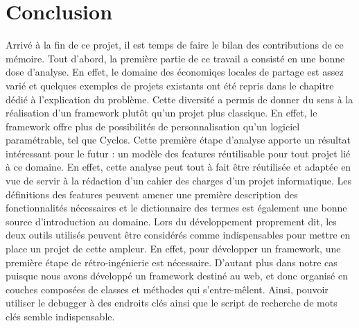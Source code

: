 \newpage
\section{Conclusion}

Arrivé à la fin de ce projet,  il est temps de faire le bilan des contributions de ce mémoire.  Tout d'abord,  la première partie de ce travail a consisté en une bonne dose d'analyse.  En effet,  le domaine des économiqes locales de partage est assez varié et quelques exemples de projets existants ont été repris dans le chapitre dédié à l'explication du problème.  Cette diversité a permis de donner du sens à la réalisation d'un framework plutôt qu'un projet plus classique.  En effet,  le framework offre plus de possibilités de personnalisation qu'un logiciel paramétrable,  tel que Cyclos.  Cette première étape d'analyse apporte un résultat intéressant pour le futur : un modèle des features réutilisable pour tout projet lié à ce domaine.  En effet,  cette analyse peut tout à fait être réutilisée et adaptée en vue de servir à la rédaction d'un cahier des charges d'un projet informatique.  Les définitions des features peuvent amener une première description des fonctionnalités nécessaires et le dictionnaire des termes est également une bonne source d'introduction au domaine.   
Lors du développement proprement dit,  les deux outils utilisés peuvent être considérés comme indispensables pour mettre en place un projet de cette ampleur.  En effet,  pour développer un framework,  une première étape de rétro-ingénierie est nécessaire.  D'autant plus dans notre cas puisque nous avons développé un framework destiné au web,  et donc organisé en couches composées de classes et méthodes qui s'entre-mêlent.  Ainsi,  pouvoir utiliser le debugger à des endroits clés ainsi que le script de recherche de mots clés semble indispensable.  


